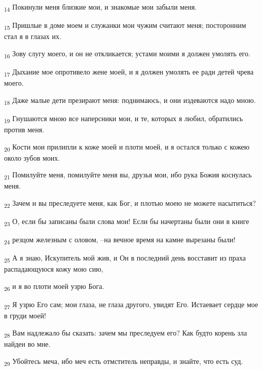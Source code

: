 \begin{tcolorbox}
\textsubscript{14} Покинули меня близкие мои, и знакомые мои забыли меня.
\end{tcolorbox}
\begin{tcolorbox}
\textsubscript{15} Пришлые в доме моем и служанки мои чужим считают меня; посторонним стал я в глазах их.
\end{tcolorbox}
\begin{tcolorbox}
\textsubscript{16} Зову слугу моего, и он не откликается; устами моими я должен умолять его.
\end{tcolorbox}
\begin{tcolorbox}
\textsubscript{17} Дыхание мое опротивело жене моей, и я должен умолять ее ради детей чрева моего.
\end{tcolorbox}
\begin{tcolorbox}
\textsubscript{18} Даже малые дети презирают меня: поднимаюсь, и они издеваются надо мною.
\end{tcolorbox}
\begin{tcolorbox}
\textsubscript{19} Гнушаются мною все наперсники мои, и те, которых я любил, обратились против меня.
\end{tcolorbox}
\begin{tcolorbox}
\textsubscript{20} Кости мои прилипли к коже моей и плоти моей, и я остался только с кожею около зубов моих.
\end{tcolorbox}
\begin{tcolorbox}
\textsubscript{21} Помилуйте меня, помилуйте меня вы, друзья мои, ибо рука Божия коснулась меня.
\end{tcolorbox}
\begin{tcolorbox}
\textsubscript{22} Зачем и вы преследуете меня, как Бог, и плотью моею не можете насытиться?
\end{tcolorbox}
\begin{tcolorbox}
\textsubscript{23} О, если бы записаны были слова мои! Если бы начертаны были они в книге
\end{tcolorbox}
\begin{tcolorbox}
\textsubscript{24} резцом железным с оловом, --на вечное время на камне вырезаны были!
\end{tcolorbox}
\begin{tcolorbox}
\textsubscript{25} А я знаю, Искупитель мой жив, и Он в последний день восставит из праха распадающуюся кожу мою сию,
\end{tcolorbox}
\begin{tcolorbox}
\textsubscript{26} и я во плоти моей узрю Бога.
\end{tcolorbox}
\begin{tcolorbox}
\textsubscript{27} Я узрю Его сам; мои глаза, не глаза другого, увидят Его. Истаевает сердце мое в груди моей!
\end{tcolorbox}
\begin{tcolorbox}
\textsubscript{28} Вам надлежало бы сказать: зачем мы преследуем его? Как будто корень зла найден во мне.
\end{tcolorbox}
\begin{tcolorbox}
\textsubscript{29} Убойтесь меча, ибо меч есть отмститель неправды, и знайте, что есть суд.
\end{tcolorbox}
